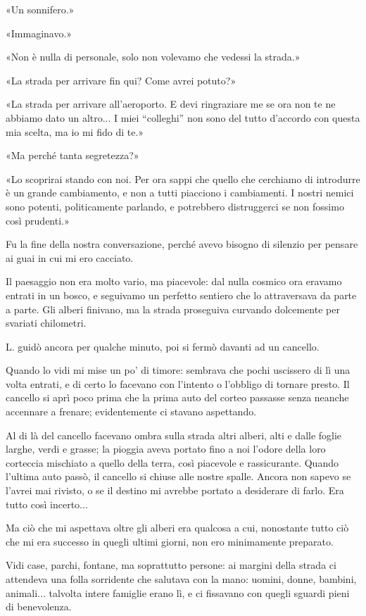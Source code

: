\documentclass[a4paper,12pt]{book}
\begin{document}
«Un sonnifero.»

«Immaginavo.»

«Non è nulla di personale, solo non volevamo che vedessi la strada.»

«La strada per arrivare fin qui? Come avrei potuto?»

«La strada per arrivare all’aeroporto. E devi ringraziare me se ora non te ne
abbiamo dato un altro... I miei ``colleghi'' non sono del tutto d’accordo
con questa mia scelta, ma io mi fido di te.»

«Ma perché tanta segretezza?»

«Lo scoprirai stando con noi. Per ora sappi che quello che cerchiamo di
introdurre è un grande cambiamento, e non a tutti piacciono i cambiamenti. I
nostri nemici sono potenti, politicamente parlando, e potrebbero distruggerci se
non fossimo così prudenti.»

Fu la fine della nostra conversazione, perché avevo bisogno di silenzio per
pensare ai guai in cui mi ero cacciato.

Il paesaggio non era molto vario, ma piacevole: dal nulla cosmico ora eravamo
entrati in un bosco, e seguivamo un perfetto sentiero che lo attraversava da
parte a parte. Gli alberi finivano, ma la strada proseguiva curvando dolcemente
per svariati chilometri.

L. guidò ancora per qualche minuto, poi si fermò davanti ad un cancello.

Quando lo vidi mi mise un po’ di timore: sembrava che pochi uscissero di lì
una volta entrati, e di certo lo facevano con l’intento o l’obbligo di
tornare presto. Il cancello si aprì poco prima che la prima auto del corteo
passasse senza neanche accennare a frenare; evidentemente ci stavano aspettando.

Al di là del cancello facevano ombra sulla strada altri alberi, alti e dalle
foglie larghe, verdi e grasse; la pioggia aveva portato fino a noi l’odore
della loro corteccia mischiato a quello della terra, così piacevole e
rassicurante. Quando l’ultima auto passò, il cancello si chiuse alle nostre
spalle. Ancora non sapevo se l’avrei mai rivisto, o se il destino mi avrebbe
portato a desiderare di farlo. Era tutto così incerto...

Ma ciò che mi aspettava oltre gli alberi era qualcosa a cui, nonostante tutto
ciò che mi era successo in quegli ultimi giorni, non ero minimamente preparato.

Vidi case, parchi, fontane, ma soprattutto persone: ai margini della strada ci
attendeva una folla sorridente che salutava con la mano: uomini, donne, bambini,
animali... talvolta intere famiglie erano lì, e ci fissavano con quegli sguardi
pieni di benevolenza.
\end{document}
